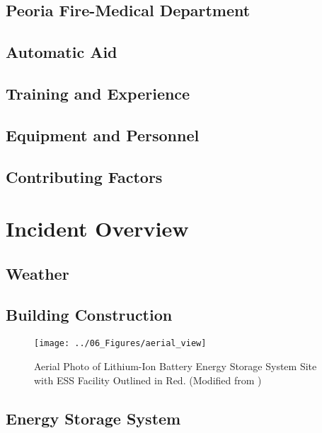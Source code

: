 \documentclass[12pt,oneside]{book}
\begin{document}
\section{Peoria Fire-Medical Department} 


\section{Automatic Aid}
\label{chap:mutual_aid}


\section{Training and Experience}
\label{chap:training_experience}


\section{Equipment and Personnel}
\label{chap:equip_personnel}


\section{Contributing Factors}
\label{chap:equip_personnel}


\chapter{Incident Overview}


\section{Weather}
\label{chap:weather}


\section{Building Construction}
\label{chap:building_construction}


\begin{figure}[!ht]
	\centering
	\texttt{[image: ../06\_Figures/aerial\_view]}
	\caption[Aerial Photo of LIB ESS]{Aerial Photo of Lithium-Ion Battery Energy Storage System Site with ESS Facility Outlined in Red. (Modified from \cite{google_maps})}
	\label{fig:aerial_photo}
\end{figure}


\section{Energy Storage System}
\label{chap:ess_system}
\end{document}
